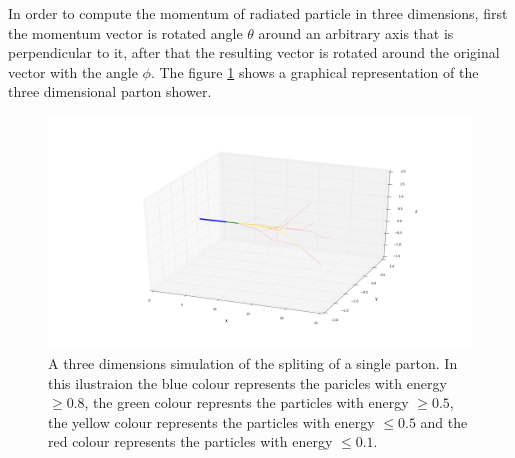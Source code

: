 In order to compute the momentum of radiated particle in three dimensions, first the momentum vector is rotated angle $\theta$ around an arbitrary axis that is perpendicular to it, after that the resulting vector is rotated around the original vector with the angle $\phi$.
The figure \ref{fig:3dparton} shows a graphical representation of the three dimensional parton shower. 

%
%
% 
\begin{figure}[H]
\centering
\includegraphics[scale=.3]{images/3D_partonshower.png}
\caption{A three dimensions simulation of the spliting of a single parton. In this ilustraion the blue colour represents the paricles with energy $\geq 0.8$, the green colour represnts the particles with energy $\geq 0.5$, the yellow colour represents the particles with energy $\leq 0.5$ and the red colour represents the particles with energy $\leq 0.1$.}\label{fig:3dparton}
\end{figure}
%
